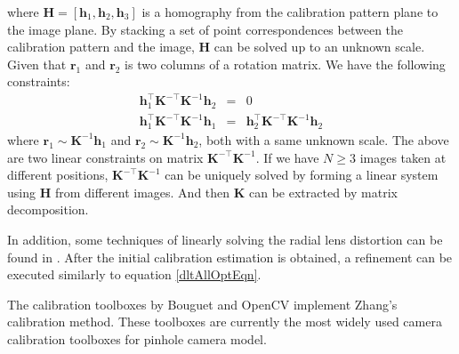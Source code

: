 \documentclass{report}
\begin{document}
where $\mathbf{H} = [\mathbf{h}_1, \mathbf{h}_2, \mathbf{h}_3]$ is a homography from the calibration pattern plane to the image plane. By stacking a set of point correspondences between the calibration pattern and the image, $\mathbf{H}$ can be solved up to an unknown scale. Given that $\mathbf{r}_1$ and $\mathbf{r}_2$ is two columns of a rotation matrix. We have the following constraints: 
\begin{eqnarray}
\mathbf{h}_1^\top \mathbf{K}^{-\top} \mathbf{K}^{-1} \mathbf{h}_2 &=& 0 \\
\mathbf{h}_1^\top \mathbf{K}^{-\top} \mathbf{K}^{-1} \mathbf{h}_1 &=& \mathbf{h}_2^\top \mathbf{K}^{-\top} \mathbf{K}^{-1} \mathbf{h}_2
\end{eqnarray}
where $\mathbf{r}_1 \sim \mathbf{K}^{-1} \mathbf{h}_1$ and $\mathbf{r}_2 \sim \mathbf{K}^{-1} \mathbf{h}_2$, both with a same unknown scale. The above are two linear constraints on matrix $\mathbf{K}^{-\top} \mathbf{K}^{-1}$. If we have $N \geq 3$ images taken at different positions, $\mathbf{K}^{-\top} \mathbf{K}^{-1}$ can be uniquely solved by forming a linear system using $\mathbf{H}$ from different images. And then $\mathbf{K}$ can be extracted by matrix decomposition. 

In addition, some techniques of linearly solving the radial lens distortion can be found in \cite{zhang2000flexible}. After the initial calibration estimation is obtained, a refinement can be executed similarly to equation \ref{dltAllOptEqn}. 

The calibration toolboxes by Bouguet \cite{bouguet2004camera} and OpenCV \cite{opencv_library} implement Zhang's calibration method. These toolboxes are currently the most widely used camera calibration toolboxes for pinhole camera model. 
\end{document}
